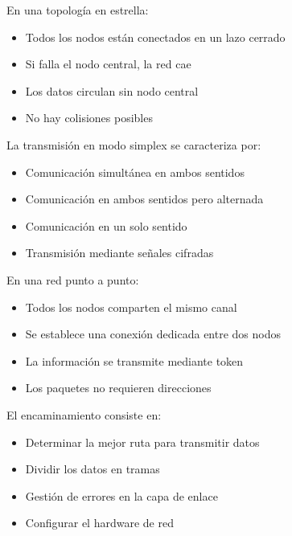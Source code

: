\documentclass[11pt]{article}
\begin{document}
En una topología en estrella:

\begin{itemize}
\item Todos los nodos están conectados en un lazo cerrado

\item Si falla el nodo central, la red cae

\item Los datos circulan sin nodo central

\item No hay colisiones posibles
\end{itemize}

La transmisión en modo simplex se caracteriza por:
\begin{itemize}
\item Comunicación simultánea en ambos sentidos

\item Comunicación en ambos sentidos pero alternada

\item Comunicación en un solo sentido

\item Transmisión mediante señales cifradas
\end{itemize}

En una red punto a punto:

\begin{itemize}
\item Todos los nodos comparten el mismo canal

\item Se establece una conexión dedicada entre dos nodos

\item La información se transmite mediante token

\item Los paquetes no requieren direcciones
\end{itemize}

El encaminamiento consiste en:

\begin{itemize}
\item Determinar la mejor ruta para transmitir datos

\item Dividir los datos en tramas

\item Gestión de errores en la capa de enlace

\item Configurar el hardware de red
\end{itemize}
\end{document}
